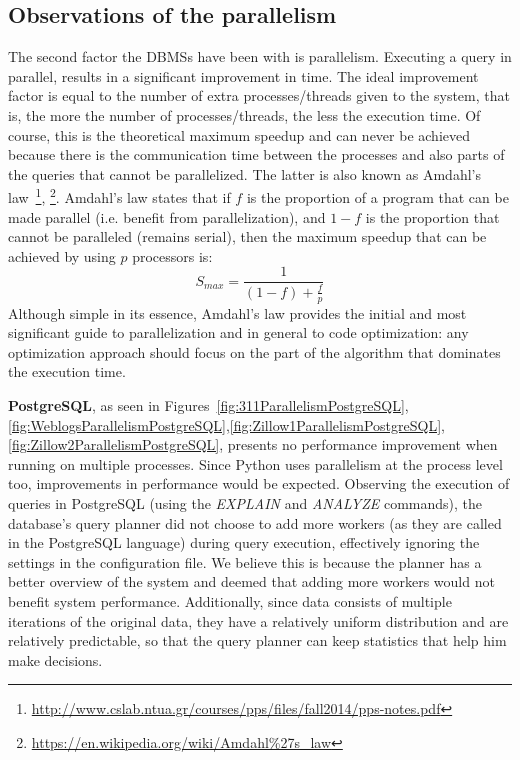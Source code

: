\subsection{Observations of the parallelism}
The second factor the DBMSs have been with is parallelism. Executing a query in parallel, 
results in a significant improvement in time. The ideal improvement factor is equal to the 
number of extra processes/threads given to the system, that is, the more the number 
of processes/threads, the less the execution time. Of course, this is the 
theoretical maximum speedup and can never be achieved because there is the communication 
time between the processes and also parts of the queries that cannot be parallelized. 
The latter is also known as Amdahl's 
law~\footnote{\url{http://www.cslab.ntua.gr/courses/pps/files/fall2014/pps-notes.pdf}},
\footnote{\url{https://en.wikipedia.org/wiki/Amdahl\%27s\_law}}. 
Amdahl's law states that if 
$f$ is the proportion of a program that can be made parallel (i.e. benefit from parallelization), 
and $1-f$ is the proportion that cannot be paralleled (remains serial), then the maximum 
speedup that can be achieved by using $p$ processors is: 
\begin{equation}
    S_{max} = \frac{1}{\left ( 1-f \right ) + \frac{f}{p}}
\end{equation}
Although simple in its essence, Amdahl's law provides the initial and most significant 
guide to parallelization and in general to code optimization: any optimization approach 
should focus on the part of the algorithm that dominates the execution time.

\textbf{PostgreSQL}, as seen in Figures~\ref{fig:311ParallelismPostgreSQL},\ref{fig:WeblogsParallelismPostgreSQL},\ref{fig:Zillow1ParallelismPostgreSQL},\ref{fig:Zillow2ParallelismPostgreSQL}, presents no performance improvement 
when running on multiple processes.
Since Python uses parallelism at the process level too, 
improvements in performance would be expected. Observing the execution of queries 
in PostgreSQL (using the \emph{EXPLAIN} and \emph{ANALYZE} commands), the database's 
query planner did not choose to add more workers (as they are called in the PostgreSQL language) 
during query execution, effectively ignoring the settings in the configuration file. 
We believe this is because the planner has a better overview of the system and deemed 
that adding more workers would not benefit system performance. 
Additionally, since data consists of multiple iterations of the 
original data, they have a relatively uniform distribution and are relatively predictable, 
so that the query planner can keep statistics that help him make decisions. 


